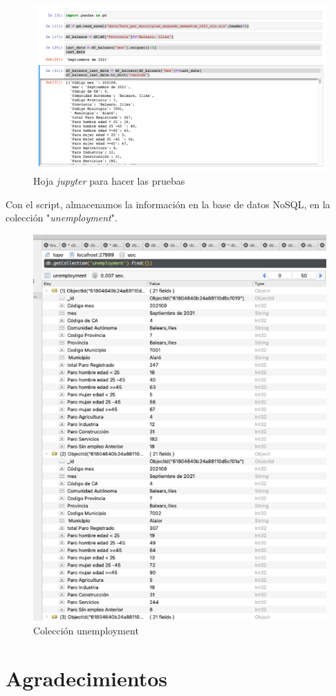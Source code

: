 \documentclass[a4paper, 12pt]{article}
\begin{document}
\begin{enumerate}
	\begin{figure}[H]
		\centering
		\includegraphics[width=0.7\linewidth]{img/screenshot023}
		\caption{Hoja {\itshape jupyter} para hacer las pruebas}
		\label{fig:screenshot023}
	\end{figure}
	
	Con el script, almacenamos la información en la base de datos NoSQL, en la colección "{\itshape unemployment}".
	
	\begin{figure}[H]
		\centering
		\includegraphics[width=0.7\linewidth]{img/screenshot024}
		\caption{Colección unemployment}
		\label{fig:screenshot024}
	\end{figure}
	
\end{enumerate}

\section{Agradecimientos}
\end{document}
